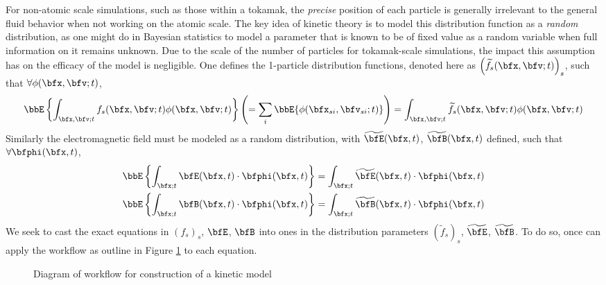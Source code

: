     For non-atomic scale simulations, such as those within a tokamak, the \emph{precise} position of each particle is generally irrelevant to the general fluid behavior when not working on the atomic scale. The key idea of kinetic theory is to model this distribution function as a \emph{random} distribution, as one might do in Bayesian statistics to model a parameter that is known to be of fixed value as a random variable when full information on it remains unknown. Due to the scale of the number of particles for tokamak-scale simulations, the impact this assumption has on the efficacy of the model is negligible. One defines the 1-particle distribution functions, denoted here as $\left(\widetilde{f}_{s}(\bfx, \bfv; t)\right)_{s}$, such that $\forall \phi(\bfx, \bfv; t)$,
    \begin{equation}
        \bbE\left\{\int_{\bfx, \bfv; t}f_{s}(\bfx, \bfv; t)\phi(\bfx, \bfv; t)\right\}
        \left(=  \sum_{i}\bbE\{\phi(\bfx_{si}, \bfv_{si}; t)\}\right)
        =  \int_{\bfx, \bfv; t}\widetilde{f}_{s}(\bfx, \bfv; t)\phi(\bfx, \bfv;t )
    \end{equation}
    Similarly the electromagnetic field must be modeled as a random distribution, with $\widetilde{\bfE}(\bfx, t)$, $\widetilde{\bfB}(\bfx, t)$ defined, such that $\forall \bfphi(\bfx, t)$,
    \begin{align}
        \bbE\left\{\int_{\bfx; t}\bfE(\bfx, t)\cdot\bfphi(\bfx, t)\right\}  =  \int_{\bfx; t}\widetilde{\bfE}(\bfx, t)\cdot\bfphi(\bfx, t)  \\ 
        \bbE\left\{\int_{\bfx; t}\bfB(\bfx, t)\cdot\bfphi(\bfx, t)\right\}  =  \int_{\bfx; t}\widetilde{\bfB}(\bfx, t)\cdot\bfphi(\bfx, t)
    \end{align}
    We seek to cast the exact equations in $(f_{s})_{s}$, $\bfE$, $\bfB$ into ones in the distribution parameters $(\widetilde{f}_{s})_{s}$, $\widetilde{\bfE}$, $\widetilde{\bfB}$. To do so, once can apply the workflow as outline in Figure \ref{fig:kinetic model construction workflow} to each equation.
    \begin{figure}[!ht]
        \centering
        \caption{Diagram of workflow for construction of a kinetic model}
        \label{fig:kinetic model construction workflow}
    \end{figure}

